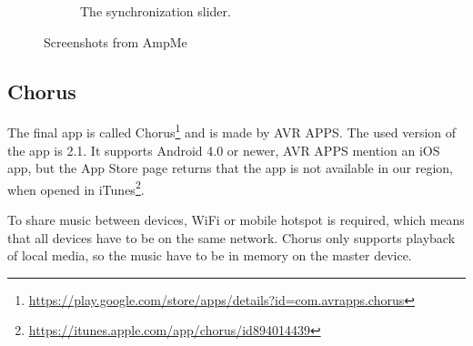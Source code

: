 \begin{figure}[h!]
\begin{subfigure}[b]{0.45\textwidth}
        \caption{The synchronization slider.}\label{fig:ampme_slider}
    \end{subfigure}
    \caption{Screenshots from AmpMe}\label{fig:ampme_screenshots}
\end{figure}

\subsection{Chorus}\label{subsec:chorus}
The final app is called
Chorus\footnote{\url{https://play.google.com/store/apps/details?id=com.avrapps.chorus}} and is made by AVR APPS.
The used version of the app is 2.1.
It supports Android 4.0 or newer, AVR APPS mention an iOS app, but the App Store page returns that the app is not available in our region,
when opened in iTunes\footnote{\url{https://itunes.apple.com/app/chorus/id894014439}}.

To share music between devices, WiFi or mobile hotspot is required,
which means that all devices have to be on the same network.
Chorus only supports playback of local media, so the music have to be in memory on the master device.

